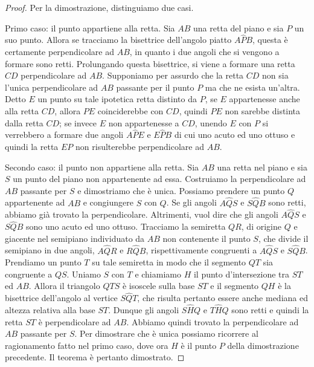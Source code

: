 \begin{proof}
Per la dimostrazione, distinguiamo due casi.

Primo caso: il punto appartiene alla retta.
Sia $AB$ una retta del piano e sia $P$ un suo punto. Allora se tracciamo la bisettrice dell'angolo piatto $A\widehat{P}B$, questa è certamente perpendicolare ad $AB$, in quanto i due angoli che si vengono a formare sono retti.
Prolungando questa bisettrice, si viene a formare una retta $CD$ perpendicolare ad $AB$.  
Supponiamo per assurdo che la retta $CD$ non sia l'unica perpendicolare ad $AB$ passante per il punto $P$ ma che ne esista un'altra. Detto $E$ un punto su tale ipotetica retta distinto da $P$, se $E$ appartenesse anche alla retta $CD$, allora $PE$ coinciderebbe con $CD$, quindi $PE$ non sarebbe distinta dalla retta $CD$; se invece $E$ non appartenesse a $CD$, unendo $E$ con $P$ si verrebbero a formare due angoli $A\widehat{P}E$ e $E\widehat{P}B$ di cui uno acuto ed uno ottuso e quindi la retta $EP$ non risulterebbe perpendicolare ad $AB$.

Secondo caso: il punto non appartiene alla retta.
Sia $AB$ una retta nel piano e sia $S$ un punto del piano non appartenente ad essa. Costruiamo la perpendicolare ad $AB$ passante per $S$ e dimostriamo che è unica.
Possiamo prendere un punto $Q$ appartenente ad $AB$ e congiungere $S$ con $Q$. Se gli angoli $A\widehat{Q}S$ e $S\widehat{Q}B$ sono retti, abbiamo già trovato la perpendicolare. Altrimenti, vuol dire che gli angoli $A\widehat{Q}S$ e $S\widehat{Q}B$ sono uno acuto ed uno ottuso. Tracciamo la semiretta $QR$, di origine $Q$ e giacente nel semipiano individuato da $AB$ non contenente il punto $S$, che divide il semipiano in due angoli, $A\widehat{Q}R$ e $R\widehat{Q}B$, rispettivamente congruenti a $A\widehat{Q}S$ e $S\widehat{Q}B$. Prendiamo un punto $T$ su tale semiretta in modo che il segmento $QT$ sia congruente a $QS$. Uniamo $S$ con $T$ e chiamiamo $H$ il punto d'intersezione tra $ST$ ed $AB$. Allora il triangolo $QTS$ è isoscele sulla base $ST$ e il segmento $QH$ è la bisettrice dell'angolo al vertice $S\widehat{Q}T$, che risulta pertanto essere anche mediana ed altezza relativa alla base $ST$. Dunque gli angoli $S\widehat{H}Q$ e $T\widehat{H}Q$ sono retti e quindi la retta $ST$ è perpendicolare ad $AB$.
Abbiamo quindi trovato la perpendicolare ad $AB$ passante per $S$. Per dimostrare che è unica possiamo ricorrere al ragionamento fatto nel primo caso, dove ora $H$ è il punto $P$ della dimostrazione precedente.
Il teorema è pertanto dimostrato.
\end{proof}

